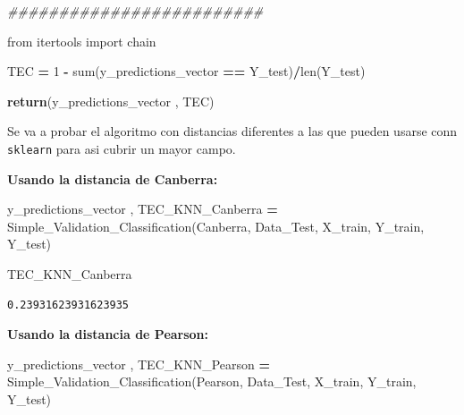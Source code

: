 \documentclass[
  11pt,
  a4paper,
]{article}
\newenvironment{Shaded}{\begin{snugshade}}{\end{snugshade}}
\newcommand{\BuiltInTok}[1]{#1}
\newcommand{\CommentTok}[1]{\textcolor[rgb]{0.56,0.35,0.01}{\textit{#1}}}
\newcommand{\ControlFlowTok}[1]{\textcolor[rgb]{0.13,0.29,0.53}{\textbf{#1}}}
\newcommand{\DecValTok}[1]{\textcolor[rgb]{0.00,0.00,0.81}{#1}}
\newcommand{\ImportTok}[1]{#1}
\newcommand{\NormalTok}[1]{#1}
\newcommand{\OperatorTok}[1]{\textcolor[rgb]{0.81,0.36,0.00}{\textbf{#1}}}
\newcommand{\StringTok}[1]{\textcolor[rgb]{0.31,0.60,0.02}{#1}}
\begin{document}
\begin{Shaded}
\begin{Highlighting}[]
    \CommentTok{\#\#\#\#\#\#\#\#\#\#\#\#\#\#\#\#\#\#\#\#\#\#\#\#\#}

    \ImportTok{from}\NormalTok{ itertools }\ImportTok{import}\NormalTok{ chain}

\NormalTok{    TEC }\OperatorTok{=} \DecValTok{1} \OperatorTok{{-}} \BuiltInTok{sum}\NormalTok{(y\_predictions\_vector }\OperatorTok{==}\NormalTok{ Y\_test)}\OperatorTok{/}\BuiltInTok{len}\NormalTok{(Y\_test)     }

 
    \ControlFlowTok{return}\NormalTok{(y\_predictions\_vector , TEC)}
\end{Highlighting}
\end{Shaded}

\newpage

Se va a probar el algoritmo con distancias diferentes a las que pueden
usarse conn \texttt{sklearn} para asi cubrir un mayor campo.

\vspace{0.35cm}

\textbf{Usando la distancia de Canberra:}

\begin{Shaded}
\begin{Highlighting}[]
\NormalTok{y\_predictions\_vector , TEC\_KNN\_Canberra }\OperatorTok{=}\NormalTok{ Simple\_Validation\_Classification(}\StringTok{\textquotesingle{}Canberra\textquotesingle{}}\NormalTok{, Data\_Test, X\_train, Y\_train, Y\_test)}
\end{Highlighting}
\end{Shaded}

\begin{Shaded}
\begin{Highlighting}[]
\NormalTok{TEC\_KNN\_Canberra}
\end{Highlighting}
\end{Shaded}

\begin{verbatim}
0.23931623931623935
\end{verbatim}

\vspace{0.35cm}

\textbf{Usando la distancia de Pearson:}

\begin{Shaded}
\begin{Highlighting}[]
\NormalTok{y\_predictions\_vector , TEC\_KNN\_Pearson }\OperatorTok{=}\NormalTok{ Simple\_Validation\_Classification(}\StringTok{\textquotesingle{}Pearson\textquotesingle{}}\NormalTok{, Data\_Test, X\_train, Y\_train, Y\_test)}
\end{Highlighting}
\end{Shaded}
\end{document}

